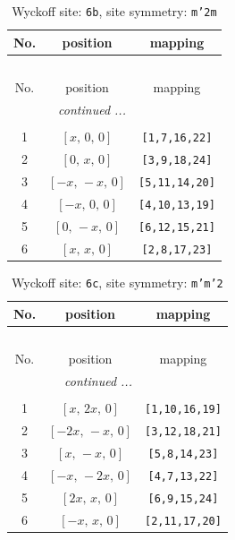 \documentclass[fleqn,8pt]{jsarticle}
\begin{document}
\begin{longtable}{ccc}
\caption{Wyckoff site: {\tt 6b}, site symmetry: {\tt m'2m}}
 \\
 \hline \hline
No. & position & mapping \\ \hline \endfirsthead

\multicolumn{2}{l}{\tablename\ \thetable{}} \\
 \hline \hline
No. & position & mapping \\ \hline \endhead

 \hline \hline
\multicolumn{2}{r}{\footnotesize\it continued ...} \\ \endfoot

 \hline \hline
\multicolumn{2}{r}{} \\ \endlastfoot

1 & $\left[ x,\, 0,\, 0 \right]$ & {\tt [1,7,16,22]} \\ \hline
2 & $\left[ 0,\, x,\, 0 \right]$ & {\tt [3,9,18,24]} \\ \hline
3 & $\left[ - x,\, - x,\, 0 \right]$ & {\tt [5,11,14,20]} \\ \hline
4 & $\left[ - x,\, 0,\, 0 \right]$ & {\tt [4,10,13,19]} \\ \hline
5 & $\left[ 0,\, - x,\, 0 \right]$ & {\tt [6,12,15,21]} \\ \hline
6 & $\left[ x,\, x,\, 0 \right]$ & {\tt [2,8,17,23]} \\
\end{longtable}
\renewcommand{\arraystretch}{1.2}
\begin{longtable}{ccc}
\caption{Wyckoff site: {\tt 6c}, site symmetry: {\tt m'm'2}}
 \\
 \hline \hline
No. & position & mapping \\ \hline \endfirsthead

\multicolumn{2}{l}{\tablename\ \thetable{}} \\
 \hline \hline
No. & position & mapping \\ \hline \endhead

 \hline \hline
\multicolumn{2}{r}{\footnotesize\it continued ...} \\ \endfoot

 \hline \hline
\multicolumn{2}{r}{} \\ \endlastfoot

1 & $\left[ x,\, 2 x,\, 0 \right]$ & {\tt [1,10,16,19]} \\ \hline
2 & $\left[ - 2 x,\, - x,\, 0 \right]$ & {\tt [3,12,18,21]} \\ \hline
3 & $\left[ x,\, - x,\, 0 \right]$ & {\tt [5,8,14,23]} \\ \hline
4 & $\left[ - x,\, - 2 x,\, 0 \right]$ & {\tt [4,7,13,22]} \\ \hline
5 & $\left[ 2 x,\, x,\, 0 \right]$ & {\tt [6,9,15,24]} \\ \hline
6 & $\left[ - x,\, x,\, 0 \right]$ & {\tt [2,11,17,20]} \\
\end{longtable}
\end{document}
